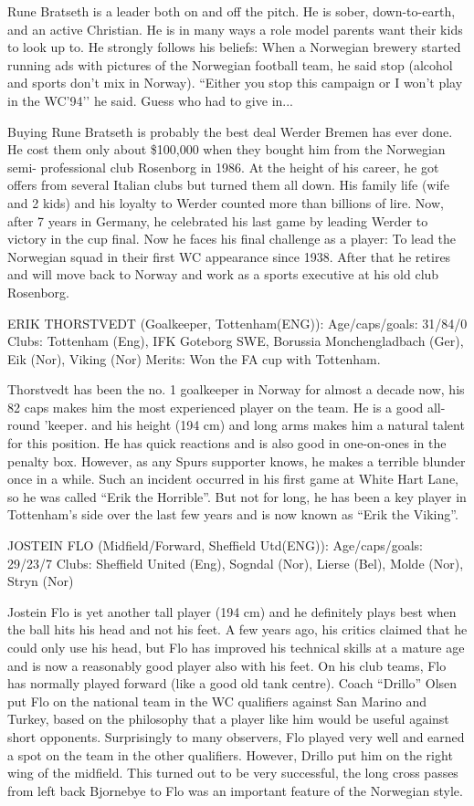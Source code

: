 Rune Bratseth is a leader both on and off the pitch. He is sober, down-to-earth,
and an active Christian. He is in many ways a role model parents want their kids
to look up to. He strongly follows his beliefs: When a Norwegian brewery 
started running ads with pictures of the Norwegian football team, he said stop
(alcohol and sports don't mix in Norway). ``Either you stop this campaign or I 
won't play in the WC’94’’ he said. Guess who had to give in...

Buying Rune Bratseth is probably the best deal Werder Bremen has ever done. He 
cost them only about \$100,000 when they bought him from the Norwegian semi-
professional club Rosenborg in 1986. At the height of his career, he got offers 
from several Italian clubs but turned them all down. His family life (wife 
and 2 kids) and his loyalty to Werder counted more than billions of lire. Now, 
after 7 years in Germany, he celebrated his last game by leading Werder to 
victory in the cup final. Now he faces his final challenge as a player: To lead 
the Norwegian squad in their first WC appearance since 1938. After that he 
retires and will move back to Norway and work as a sports executive at his old
club Rosenborg.


ERIK THORSTVEDT (Goalkeeper, Tottenham(ENG)):
Age/caps/goals: 31/84/0
Clubs: Tottenham (Eng), IFK G{\”o}teborg SWE, Borussia Monchengladbach (Ger),
       Eik (Nor), Viking (Nor)
Merits: Won the FA cup with Tottenham.

Thorstvedt has been the no. 1 goalkeeper in Norway for almost a decade now, his 
82 caps makes him the most experienced player on the team. He is a good all-
round 'keeper. and his height (194 cm) and long arms makes him a natural talent 
for this position. He has quick reactions and is also good in one-on-ones in 
the penalty box. However, as any Spurs supporter knows, he makes a terrible 
blunder once in a while. Such an incident occurred in his first game at White 
Hart Lane, so he was called ``Erik the Horrible''. But not for long, he has been 
a key player in Tottenham's side over the last few years and is now known as 
``Erik the Viking''.


JOSTEIN FLO (Midfield/Forward, Sheffield Utd(ENG)):
Age/caps/goals: 29/23/7
Clubs: Sheffield United (Eng), Sogndal (Nor), Lierse (Bel), Molde (Nor),
       Stryn (Nor)
  
Jostein Flo is yet another tall player (194 cm) and he definitely plays best 
when the ball hits his head and not his feet. A few years ago, his critics 
claimed that he could only use his head, but Flo has improved his technical 
skills at a mature age and is now a reasonably good player also with his feet. 
On his club teams, Flo has normally played forward (like a good old tank centre). 
Coach ``Drillo'' Olsen put Flo on the national team in the WC qualifiers against 
San Marino and Turkey, based on the philosophy that a player like him would be 
useful against short opponents. Surprisingly to many observers, Flo played very 
well and earned a spot on the team in the other qualifiers. However, Drillo
put him on the right wing of the midfield. This turned out to be very 
successful, the long cross passes from left back Bjornebye to Flo was an
important feature of the Norwegian style.

